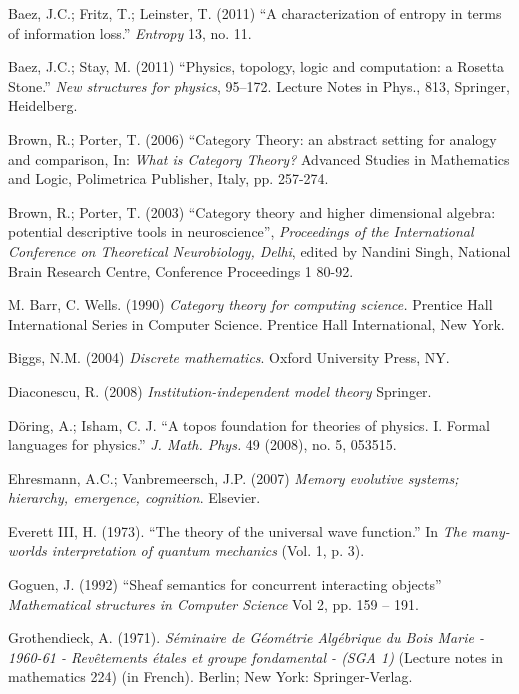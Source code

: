 \documentclass[a4paper]{book}
\theoremstyle{myth}
\begin{document}
\begin{russian}
\begin{thebibliography}{SGWB}
 Baez, J.C.; Fritz, T.; Leinster, T. (2011) “A characterization of entropy in terms of information loss.” {\em Entropy} 13, no. 11.

 Baez, J.C.; Stay, M. (2011) “Physics, topology, logic and computation: a Rosetta Stone.” {\em New structures for physics}, 95–172. Lecture Notes in Phys., 813, Springer, Heidelberg.

 Brown, R.; Porter, T. (2006) “Category Theory: an abstract setting for
analogy and comparison, In: {\em What is Category Theory?} Advanced
Studies in Mathematics and Logic, Polimetrica Publisher, Italy, pp. 257-274.

 Brown, R.; Porter, T. (2003) “Category theory and higher dimensional
algebra: potential descriptive tools in neuroscience”, {\em Proceedings
of the International Conference on Theoretical Neurobiology, Delhi}, edited by Nandini Singh, National Brain Research
Centre, Conference Proceedings 1 80-92. 

 M. Barr, C. Wells. (1990) {\em Category theory for computing science.} Prentice Hall International Series in Computer Science. Prentice Hall International, New York.

 Biggs, N.M. (2004) {\em Discrete mathematics}. Oxford University Press, NY. 

 Diaconescu, R. (2008) {\em Institution-independent model theory} Springer.

 D\"{o}ring, A.; Isham, C. J. “A topos foundation for theories of physics. I. Formal languages for physics.” 
{\em J. Math. Phys.} 49 (2008), no. 5, 053515.

 Ehresmann, A.C.; Vanbremeersch, J.P. (2007) {\em Memory evolutive systems; hierarchy, emergence, cognition}. Elsevier.

 Everett III, H. (1973). “The theory of the universal wave function.” In {\em The many-worlds interpretation of quantum mechanics} (Vol. 1, p. 3).

 Goguen, J. (1992) “Sheaf semantics for concurrent interacting objects” {\em Mathematical structures in Computer Science} Vol 2, pp. 159 -- 191.

 Grothendieck, A. (1971). {\em S\'eminaire de G\'eom\'etrie Alg\'ebrique du Bois Marie - 1960-61 - Rev\^etements \'etales et groupe fondamental - (SGA 1)} (Lecture notes in mathematics 224) (in French). Berlin; New York: Springer-Verlag.


\end{thebibliography}
\end{russian}
\end{document}
